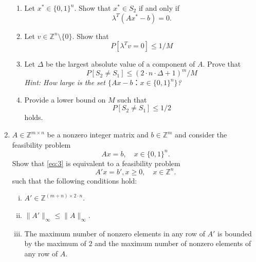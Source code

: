 \documentclass[11pt,a4paper]{article}
\begin{document}
\begin{enumerate}
\begin{enumerate}
  \item Let $x^* ∈ \{0,1\}^n$. Show that $x^* ∈ S_2$ if and only if
    \begin{displaymath}
      λ^T (A x^* - b) = 0.
    \end{displaymath}
  \item Let $v ∈ℤ^n \setminus \{0\}$. Show that
    \begin{displaymath}
      P\left[ λ^T v = 0\right] ≤ 1/M 
    \end{displaymath}  
  \item Let $Δ$ be the largest absolute value of a component of $A$.  Prove that
    \begin{displaymath}
      P \left[ S_2 ≠ S_1\right] ≤ (2 ⋅ n ⋅ Δ +1)^m / M
    \end{displaymath}
    \hfill     \emph{Hint: How large is the set $\{Ax - b ： x ∈ \{0,1\}^n \}$?} 
  \item Provide a lower bound on $M$ such that
    \begin{displaymath}
      P \left[ S_2 ≠ S_1\right] ≤  1/2
    \end{displaymath}
    holds. 
  \end{enumerate}
\item $A ∈ ℤ^{ m ×n}$ be a nonzero integer matrix and $b ∈ ℤ^m$ and consider the feasibility problem 
  \begin{equation} 
    \label{eq:3}
    Ax = b, \quad x ∈ \{0,1\}^n.  
  \end{equation}
  Show that \eqref{eq:3} is equivalent to a feasibility problem
  \begin{displaymath}
    A'x = b', x≥0, \quad x ∈ ℤ^n.    
  \end{displaymath}
  such that the following conditions hold:
  \begin{enumerate}[i)] 
  \item $A' ∈ℤ^{ (m+n) ×2⋅n}$. 
  \item $\|A' \|_∞ ≤  \|A\|_∞$.
  \item The maximum number of nonzero elements in any row of $A'$ is
    bounded by the maximum of $2$ and the maximum number of nonzero
    elements of any row of $A$.
  \end{enumerate}


\end{enumerate}
\end{document}
